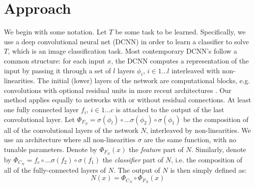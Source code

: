 \documentclass[10pt,journal,compsoc]{IEEEtran}
\makeatletter
\newcommand{\eg}{e.g.\@\xspace}
\newcommand{\ie}{i.e.\@\xspace}
\makeatother
\begin{document}
\begin{figure*}
\begin{centering}
\par\end{centering}
\caption{\label{fig:Transferability-of-various} Transferability of various
datasets to each other (\emph{ft-last}) fine tuning only the last
layer (\emph{full}) fine-tuning all layers (\emph{ft-full-bn-off})
fine tuning all layers while disallowing batch-normalization layers'
weights to be updated. Overall, networks tend to be more easily transferable
to problems from related domains (\eg, natural / drawing). Zoom in
to see numbers. It is recommended to view this figure in color on-line. }
\end{figure*}

\section{Approach\label{sec:Approach}}

We begin with some notation. Let $T$ be some task to be learned.
Specifically, we use a deep convolutional neural net (DCNN) in order
to learn a classifier to solve $T$, which is an image classification
task. Most contemporary DCNN's follow a common structure: for each
input $x$, the DCNN computes a representation of the input by passing
it through a set of $l$ layers $\phi_{i}$, $i\in1\ldots l$ interleaved
with non-linearities. The initial (lower) layers of the network are
computational blocks, \eg convolutions with optional residual units
in more recent architectures \cite{he2016deep}. Our method applies
equally to networks with or without residual connections. At least
one fully connected layer $f_{i}$, $i\in1\ldots c$ is attached to
the output of the last convolutional layer. Let $\Phi_{F_{N}}=\sigma(\phi_{l})\circ\ldots\sigma(\phi_{2})\circ\sigma(\phi_{1})$
be the composition of all of the convolutional layers of the network
$N$, interleaved by non-linearities. We use an architecture where
all non-linearities $\sigma$ are the same function, with no tunable
parameters. Denote by $\Phi_{F_{N}}(x)$ the \emph{feature} part of
$N$. Similarly, denote by $\Phi_{C_{N}}=f_{c}\circ\ldots\sigma(f_{2})\circ\sigma(f_{1})$
the \emph{classifier} part of $N$, \ie the composition of all of
the fully-connected layers of $N$. The output of $N$ is then simply
defined as: 
\begin{equation}
N(x)=\Phi_{C_{N}}\circ\Phi_{F_{N}}(x)
\end{equation}
\end{document}
